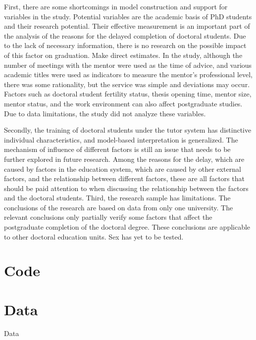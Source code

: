 \documentclass{mcmthesis}
\begin{document}
First, there are some shortcomings in model construction and support for
variables in the study.  Potential variables are the academic basis of PhD
students and their research potential. Their effective measurement is an
important part of the analysis of the reasons for the delayed completion of
doctoral students. Due to the lack of necessary information, there is no
research on the possible impact of this factor on graduation. Make direct
estimates. In the study, although the number of meetings with the mentor were
used as the time of advice, and various academic titles were used as indicators
to measure the mentor's professional level, there was some rationality, but the
service was simple and deviations may occur. Factors such as doctoral student
fertility status, thesis opening time, mentor size, mentor status, and the work
environment can also affect postgraduate studies. Due to data limitations, the
study did not analyze these variables.

Secondly, the training of doctoral students under the tutor system has
distinctive individual characteristics, and model-based interpretation is
generalized. The mechanism of influence of different factors is still an issue
that needs to be further explored in future research. Among the reasons for the
delay, which are caused by factors in the education system, which are caused by
other external factors, and the relationship between different factors, these
are all factors that should be paid attention to when discussing the
relationship between the factors and the doctoral students. Third, the research
sample has limitations. The conclusions of the research are based on data from
only one university. The relevant conclusions only partially verify some factors
that affect the postgraduate completion of the doctoral degree. These
conclusions are applicable to other doctoral education units. Sex has yet to be
tested.


\newpage





\begin{appendices}

	\section{Code}


	\section{Data}

	\begin{table}[htbp]
		\centering
		\caption{Data}
		\label{tab:Data}
	\end{table}

\end{appendices}
\end{document}
